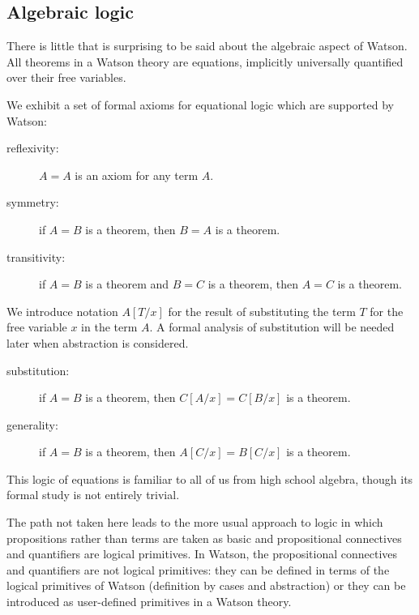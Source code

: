 \documentclass{kluwer}
\begin{document}
\begin{article}
\subsection{Algebraic logic}

There is little that is surprising to be said about the algebraic
aspect of Watson.  All theorems in a Watson theory are equations,
implicitly universally quantified over their free variables.

We exhibit a set of formal axioms for equational logic which are
supported by Watson:

\begin{description}

\item [reflexivity:] $A = A$ is an axiom for any term $A$.

\item [symmetry:] if $A = B$ is a theorem, then $B = A$ is a theorem.

\item [transitivity:] if $A = B$ is a theorem and $B = C$ is a theorem, 
then $A = C$ is a theorem.

\end{description}

We introduce notation $A[T/x]$ for the result of substituting the term
$T$ for the free variable $x$ in the term $A$.  A formal analysis of
substitution will be needed later when abstraction is considered.

\begin{description}

\item [substitution:] if $A = B$ is a theorem, then $C[A/x] = C[B/x]$ 
is a theorem.

\item [generality:]  if $A = B$ is a theorem, then $A[C/x] = B[C/x]$ 
is a theorem.

\end{description}

This logic of equations is familiar to all of us from high school
algebra, though its formal study is not entirely trivial.

The path not taken here leads to the more usual approach to logic in
which propositions rather than terms are taken as basic and
propositional connectives and quantifiers are logical primitives.  In
Watson, the propositional connectives and quantifiers are not logical
primitives: they can be defined in terms of the logical primitives of
Watson (definition by cases and abstraction) or they can be introduced
as user-defined primitives in a Watson theory.


\end{article}
\end{document}
